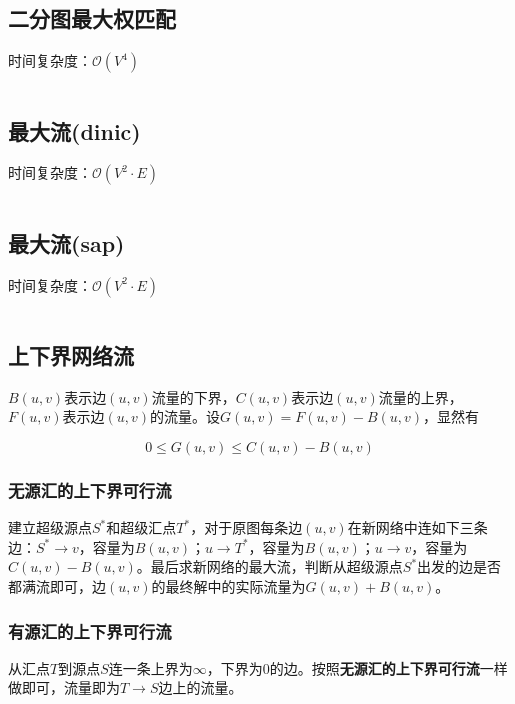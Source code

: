 \documentclass[landscape, twoside, a4paper]{article}
\newcommand{\cppcode}[1]{
	\inputminted[mathescape,
	frame=lines,linenos]{cpp}{source/#1}
}
\begin{document}
\begin{multicols}{2}
\begin{spacing}{0.8}
\subsection{二分图最大权匹配}


时间复杂度：$\mathcal{O}(V^4)$


\cppcode{graph-theory/maximum-weight-matching.cpp}


\subsection{最大流(dinic)}

时间复杂度：$\mathcal{O}(V^2 \cdot E)$

\cppcode{graph-theory/dinic.cpp}



\subsection{最大流(sap)}

时间复杂度：$\mathcal{O}(V^2 \cdot E)$

\cppcode{graph-theory/Sap.cpp}



\subsection{上下界网络流}


$B(u,v)$表示边$(u,v)$流量的下界，$C(u,v)$表示边$(u,v)$流量的上界，$F(u,v)$表示边$(u,v)$的流量。设$G(u,v) = F(u,v) - B(u,v)$，显然有

$$0 \leq G(u,v) \leq C(u,v)-B(u,v)$$


\subsubsection{无源汇的上下界可行流}


建立超级源点$S^*$和超级汇点$T^*$，对于原图每条边$(u,v)$在新网络中连如下三条边：$S^* \rightarrow v$，容量为$B(u,v)$；$u \rightarrow T^*$，容量为$B(u,v)$；$u \rightarrow v$，容量为$C(u,v) - B(u,v)$。最后求新网络的最大流，判断从超级源点$S^*$出发的边是否都满流即可，边$(u,v)$的最终解中的实际流量为$G(u,v)+B(u,v)$。


\subsubsection{有源汇的上下界可行流}


从汇点$T$到源点$S$连一条上界为$\infty$，下界为$0$的边。按照\textbf{无源汇的上下界可行流}一样做即可，流量即为$T \rightarrow S$边上的流量。



\end{spacing}
\end{multicols}
\end{document}
